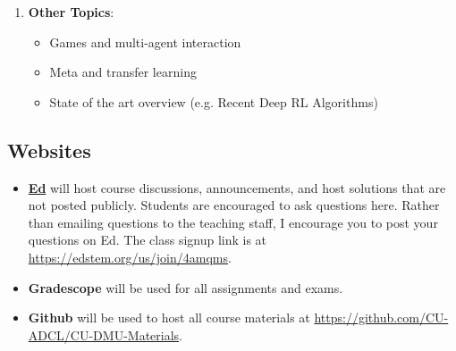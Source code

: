 \documentclass[9pt]{article}
\begin{document}
\begin{enumerate}[noitemsep]
\begin{multicols}{2}
        \begin{itemize}[noitemsep]
            \item Hidden Markov models
            \item Bayesian filters
            \item Particle filters
            \item Partially observable Markov decision processes (POMDPs)
            \item Exact POMDP methods
            \item Offline POMDP methods
            \item Online POMDP methods
            \item QMDP
        \end{itemize}
        \end{multicols}
    \item \textbf{Other Topics}:
        \begin{multicols}{2}
        \begin{itemize}[noitemsep]
            \item Games and multi-agent interaction
            \item Meta and transfer learning
            \item State of the art overview (e.g. Recent Deep RL Algorithms)
        \end{itemize}
        \end{multicols}
\end{enumerate}

\begin{samepage}
\section*{Websites}

\begin{itemize}[nosep]
    \item \href{https://edstem.org/us/courses/73137}{\textbf{Ed}} will host course discussions, announcements, and host solutions that are not posted publicly. Students are encouraged to ask questions here. Rather than emailing questions to the teaching staff, I encourage you to post your questions on Ed. The class signup link is at \url{https://edstem.org/us/join/4amqms}.
    \item \textbf{Gradescope} will be used for all assignments and exams.
    \item {\textbf{Github}} will be used to host all course materials at \url{https://github.com/CU-ADCL/CU-DMU-Materials}.
\end{itemize}

\end{samepage}
\end{document}
